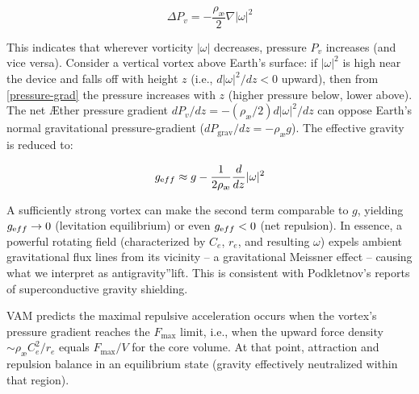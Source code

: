 \[
\Delta P_v = -\frac{\rho_\text{\ae}}{2} \nabla |\omega|^2
\]  \label{pressure-grad}

This indicates that wherever vorticity $|\omega|$ decreases, pressure $P_v$ increases (and vice versa). Consider a vertical vortex above Earth's surface: if $|\omega|^2$ is high near the device and falls off with height $z$ (i.e., $d|\omega|^2 / dz < 0$ upward), then from \eqref{pressure-grad} the pressure increases with $z$ (higher pressure below, lower above). The net Æther pressure gradient $dP_v / dz = -(\rho_\text{\ae} / 2) d|\omega|^2 / dz$ can oppose Earth's normal gravitational pressure-gradient ($dP_\text{grav} / dz = -\rho_\text{\ae} g$). The effective gravity is reduced to:

\[
g_{\textrm eff} \approx g - \frac{1}{2 \rho_\text{\ae}} \frac{d}{dz} |\omega|^2
\]  \label{g-eff}

A sufficiently strong vortex can make the second term comparable to $g$, yielding $g_{\textrm eff}\to0$ (levitation equilibrium) or even $g_{\textrm eff}<0$ (net repulsion). In essence, a powerful rotating field (characterized by $C_e$, $r_e$, and resulting $\omega$) expels ambient gravitational flux lines from its vicinity – a gravitational Meissner effect – causing what we interpret as \grqq antigravity\textquotedblright lift. This is consistent with Podkletnov's reports of superconductive gravity shielding.

VAM predicts the maximal repulsive acceleration occurs when the vortex's pressure gradient reaches the $F_{\max}$ limit, i.e., when the upward force density $\sim \rho_\text{\ae} C_e^2/r_e$ equals $F_{\max}/V$ for the core volume. At that point, attraction and repulsion balance in an equilibrium state (gravity effectively neutralized within that region).

